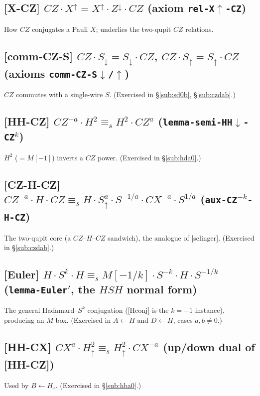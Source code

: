 \documentclass[a4paper]{article}
\newcommand{\lem}[1]{\textsf{[#1]}}      %
\begin{document}
\subsection*{\lem{X-CZ} \; $CZ\cdot X^{\uparrow} = X^{\uparrow}\cdot Z^{\downarrow}\cdot CZ$ \hfill (axiom \texttt{rel-X$\uparrow$-CZ})}
How $CZ$ conjugates a Pauli $X$; underlies the two-qupit $CZ$ relations.

\subsection*{\lem{comm-CZ-S} \; $CZ\cdot S_\downarrow = S_\downarrow\cdot CZ$, \quad $CZ\cdot S_\uparrow = S_\uparrow\cdot CZ$ \hfill (axioms \texttt{comm-CZ-S$\downarrow$/$\uparrow$})}
$CZ$ commutes with a single-wire $S$. (Exercised in \S\ref{sub:sd0b}, \S\ref{sub:czdab}.)

\subsection*{\lem{HH-CZ} \; $CZ^{-a}\cdot H^2 \equiv_s H^2\cdot CZ^{a}$ \hfill (\texttt{lemma-semi-HH$\downarrow$-CZ$^{k}$})}
$H^2$ ($=M[-1]$) inverts a $CZ$ power. (Exercised in \S\ref{sub:hda0}.)

\subsection*{\lem{CZ-H-CZ} \; $CZ^{-a}\cdot H\cdot CZ \equiv_s H\cdot S^{a}_\uparrow\cdot S^{-1/a}\cdot CX^{-a}\cdot S^{1/a}$ \hfill (\texttt{aux-CZ$^{-k}$-H-CZ})}
The two-qupit core (a $CZ$--$H$--$CZ$ sandwich), the analogue of \lem{selinger}. (Exercised in \S\ref{sub:czdab}.)

\subsection*{\lem{Euler} \; $H\cdot S^{k}\cdot H \equiv_s M[-1/k]\cdot S^{-k}\cdot H\cdot S^{-1/k}$ \hfill (\texttt{lemma-Euler$'$}, the $HSH$ normal form)}
The general Hadamard--$S^k$ conjugation (\lem{Hconj} is the $k=-1$ instance), producing an $M$ box. (Exercised in $A\leftarrow H$ and $D\leftarrow H$, cases $a,b\neq0$.)

\subsection*{\lem{HH-CX} \; $CX^{a}\cdot H^2_\uparrow \equiv_s H^2_\uparrow\cdot CX^{-a}$ \hfill (up/down dual of \lem{HH-CZ})}
Used by $B\leftarrow H_\uparrow$. (Exercised in \S\ref{sub:hba0}.)
\end{document}
